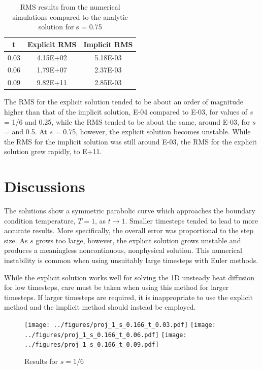 \documentclass[twocolumn,10pt]{asme2ej}
\begin{document}
\begin{table}[htb]
\begin{center}
\label{table_results4}
\begin{tabular}{|c | c c|}
\hline
t & Explicit RMS & Implicit RMS \\
\hline
0.03 & 4.15E+02 & 5.18E-03\\
0.06 & 1.79E+07 & 2.37E-03\\
0.09 & 9.82E+11 & 2.85E-03\\
\hline
\end{tabular}
\caption{RMS results from the numerical simulations compared to the analytic solution for s = 0.75}
\end{center}
\end{table}


The RMS for the explicit solution tended to be about an order of magnitude higher than that of the implicit solution, E-04 compared to E-03, for values of $s$ = 1/6 and 0.25, while the RMS tended to be about the same, around E-03, for $s$ = and 0.5. At $s$ = 0.75, however, the explicit solution becomes unstable. While the RMS for the implicit solution was still around E-03, the RMS for the explicit solution grew rapidly, to E+11.

\section{Discussions}

The solutions show a symmetric parabolic curve which approaches the boundary condition temperature, $T=1$, as $t \rightarrow 1$. Smaller timesteps tended to lead to more accurate results. More specifically, the overall error was proportional to the step size. As $s$ grows too large, however, the explicit solution grows unstable and produces a meaningless noncontinuous, nonphysical solution. This numerical instability is common when using unsuitably large timesteps with Euler methods.

While the explicit solution works well for solving the 1D unsteady heat diffusion for low timesteps, care must be taken when using this method for larger timesteps. If larger timesteps are required, it is inappropriate to use the explicit method and the implicit method should instead be employed.

\begin{figure}[b]
\begin{center}
\texttt{[image: ../figures/proj\_1\_s\_0.166\_t\_0.03.pdf]}
\texttt{[image: ../figures/proj\_1\_s\_0.166\_t\_0.06.pdf]}
\texttt{[image: ../figures/proj\_1\_s\_0.166\_t\_0.09.pdf]}
\caption{Results for $s = 1/6$}
\end{center}
\end{figure}
\end{document}
